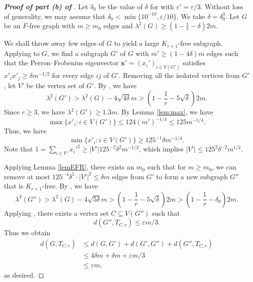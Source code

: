\documentclass[11pt,a4paper]{article}
\theoremstyle{definition}
\theoremstyle{remark}
\newcommand*{\abs}[1]{\lvert#1\rvert}
\begin{document}
\begin{proof}[{\bf Proof of part (b) of }]
    Let $\delta_0$ be the value of $\delta$ for  with $\varepsilon' = \varepsilon / 3$. Without loss of generality, we may assume that $\delta_0 < \min\{10^{-10},  \varepsilon/10\}$. We take $\delta = \delta_0^3$. Let $G$ be an $F$-free graph with $m\ge m_0$ edges and $\lambda^2 (G)\ge (1- \frac{1}{r} - \delta) 2m$.
    
    We shall throw away few edges of $G$ to yield a large $K_{r+1}$-free subgraph. Applying  to $G$, we find a subgraph $G'$ of $G$ with  $m'\ge (1 - 4\delta) m$ edges such that the Perron--Frobenius eigenvector $\bm{x}'=(x_i')_{i\in V(G')}$  satisfies $x'_i x'_j \geq \delta m^{-1/2}$ for every edge $ij$ of $G'$. Removing all the isolated vertices from $G'$, let $V'$ be the vertex set of $G'$. By , we have
    $$\lambda^2(G') > \lambda^2(G) - 4\sqrt{4\delta} m > \left(1- \frac{1}{r} - 5\sqrt{\delta} \right) 2m.$$
    Since $r \geq 3$, we have $\lambda^2(G')  \geq 1.3 m$. By Lemma \ref{lem:max}, we have 
    \[  \max\{x'_i:i \in V(G') \} \leq 124 (m')^{-1/4} \leq 125 m^{-1/4}. \] 
     Thus, we have 
     \[ \min\{x'_i :i \in V(G')\} \ge 125^{-1}\delta m^{-1/4} . \] 
     Note that $1=\sum_{i\in V'} x_i'^2 
     \ge |V'| 125^{-2}\delta^2m^{-1/2}$, 
     which implies $\abs{V'} \le 125^2 \delta^{-2} m^{1/2}$.

    Applying Lemma \ref{lemEFR}, 
    there exists an $m_0$ such that 
    for $m \ge m_0$, we can remove at most $125^{-4}\delta^5 \cdot |V'|^2 \le \delta m$ edges from $G'$ to form a new subgraph $G''$ that is $K_{r + 1}$-free. By , we have
    $$\lambda^2(G'') > \lambda^2(G) - 4\sqrt{5\delta} m > \left(1- \frac{1}{r} - 5 \sqrt{\delta} \right) 2m > \left(1- \frac{1}{r} - \delta_0 \right) 2m.$$
    Applying , there exists a vertex set $C \subseteq V(G'')$ such that
    $$d(G'', T_{C, r}) \leq \varepsilon m / 3.$$
    Thus we obtain
    \begin{align*}
    d(G, T_{C, r}) &\leq  d(G, G')+ d(G',G'')  +d(G'', T_{C, r}) \\
    &\leq 4 \delta m + \delta m +  \varepsilon m / 3  \\
    & \leq \varepsilon m , 
    \end{align*}
    as desired.
\end{proof}
\end{document}
